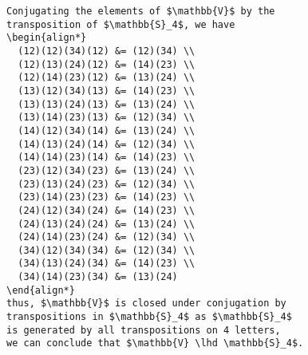 \begin{verbatim}
Conjugating the elements of $\mathbb{V}$ by the
transposition of $\mathbb{S}_4$, we have
\begin{align*}
  (12)(12)(34)(12) &= (12)(34) \\
  (12)(13)(24)(12) &= (14)(23) \\
  (12)(14)(23)(12) &= (13)(24) \\
  (13)(12)(34)(13) &= (14)(23) \\
  (13)(13)(24)(13) &= (13)(24) \\
  (13)(14)(23)(13) &= (12)(34) \\
  (14)(12)(34)(14) &= (13)(24) \\
  (14)(13)(24)(14) &= (12)(34) \\
  (14)(14)(23)(14) &= (14)(23) \\
  (23)(12)(34)(23) &= (13)(24) \\
  (23)(13)(24)(23) &= (12)(34) \\
  (23)(14)(23)(23) &= (14)(23) \\
  (24)(12)(34)(24) &= (14)(23) \\
  (24)(13)(24)(24) &= (13)(24) \\
  (24)(14)(23)(24) &= (12)(34) \\
  (34)(12)(34)(34) &= (12)(34) \\
  (34)(13)(24)(34) &= (14)(23) \\
  (34)(14)(23)(34) &= (13)(24)
\end{align*}
thus, $\mathbb{V}$ is closed under conjugation by
transpositions in $\mathbb{S}_4$ as $\mathbb{S}_4$
is generated by all transpositions on 4 letters,
we can conclude that $\mathbb{V} \lhd \mathbb{S}_4$.
\end{verbatim}

